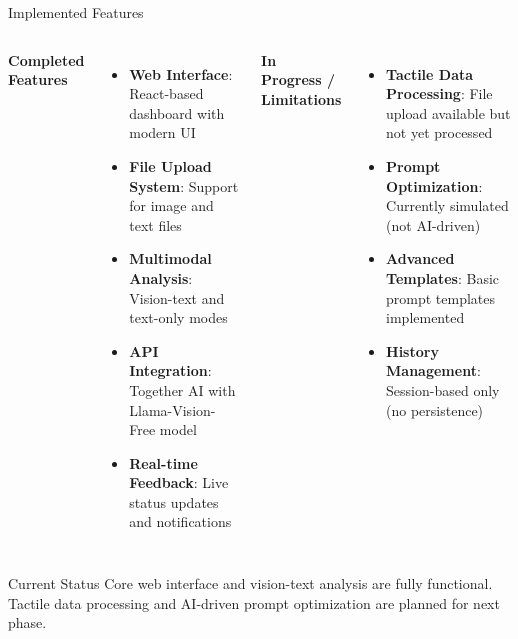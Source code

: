 \documentclass[aspectratio=169,xcolor=dvipsnames]{beamer}
\begin{document}
\begin{frame}{Implemented Features}
    \begin{columns}[c]
        \textbf{Completed Features}
        \begin{itemize}
            \item \textbf{Web Interface}: React-based dashboard with modern UI
            \item \textbf{File Upload System}: Support for image and text files
            \item \textbf{Multimodal Analysis}: Vision-text and text-only modes
            \item \textbf{API Integration}: Together AI with Llama-Vision-Free model
            \item \textbf{Real-time Feedback}: Live status updates and notifications
        \end{itemize}

        \textbf{In Progress / Limitations}
        \begin{itemize}
            \item \textbf{Tactile Data Processing}: File upload available but not yet processed
            \item \textbf{Prompt Optimization}: Currently simulated (not AI-driven)
            \item \textbf{Advanced Templates}: Basic prompt templates implemented
            \item \textbf{History Management}: Session-based only (no persistence)
        \end{itemize}
    \end{columns}
    
    \vspace{0.5cm}
    \begin{block}{Current Status}
        Core web interface and vision-text analysis are fully functional. Tactile data processing and AI-driven prompt optimization are planned for next phase.
    \end{block}
\end{frame}
\end{document}
